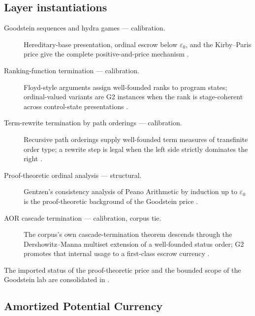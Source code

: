 \documentclass[11pt]{article}
\newcommand{\lawGThree}{Amortized Potential Currency}
\theoremstyle{definition}
\begin{document}
\subsection*{Layer instantiations}\label{layer-inst:G2}
\begin{description}
  \item[Goodstein sequences and hydra games --- calibration.] Hereditary-base presentation, ordinal
    escrow below $\varepsilon_0$, and the Kirby--Paris price give the complete positive-and-price
    mechanism \citep{KirbyParis1982}.
  \item[Ranking-function termination --- calibration.] Floyd-style arguments assign well-founded ranks
    to program states; ordinal-valued variants are G2 instances when the rank is stage-coherent across
    control-state presentations \citep{Floyd1967}.
  \item[Term-rewrite termination by path orderings --- calibration.] Recursive path orderings supply
    well-founded term measures of transfinite order type; a rewrite step is legal when the left side
    strictly dominates the right \citep{Dershowitz1982}.
  \item[Proof-theoretic ordinal analysis --- structural.] Gentzen's consistency analysis of Peano
    Arithmetic by induction up to $\varepsilon_0$ is the proof-theoretic background of the Goodstein
    price \citep{Gentzen1936}.
  \item[AOR cascade termination --- calibration, corpus tie.] The corpus's own cascade-termination
    theorem descends through the Dershowitz--Manna multiset extension of a well-founded status order;
    G2 promotes that internal usage to a first-class escrow currency
    \citep{DershowitzManna1979,Tsiokos2026AOR}.
\end{description}

The imported status of the proof-theoretic price and the bounded scope of the Goodstein lab are
consolidated in .

\subsection{\lawGThree}\label{sec:clusterA:g3}
\end{document}
